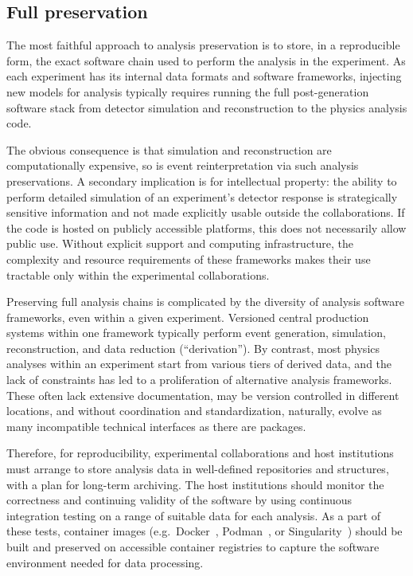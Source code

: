 \documentclass[11pt]{article}
\begin{document}
\subsection{Full preservation}\label{section:full-detail-preservation}

The most faithful approach to analysis preservation is to store, in a reproducible form, the exact software chain used to perform the analysis in the experiment. As each experiment has its internal data formats and software frameworks, injecting new models for analysis typically requires running the full post-generation software stack from detector simulation and reconstruction to the physics analysis code.

The obvious consequence is that simulation and reconstruction are computationally expensive, so is event reinterpretation via such \glspl{analysis preservation}. A secondary implication is for intellectual property: the ability to perform detailed simulation of an experiment's detector response is strategically sensitive information and not made explicitly usable outside the collaborations. If the code is hosted on publicly accessible platforms, this does not necessarily allow public use. Without explicit support and computing infrastructure, the complexity and resource requirements of these frameworks makes their use tractable only within the experimental collaborations.

Preserving full analysis chains is complicated by the diversity of analysis software frameworks, even within a given experiment.
Versioned central production systems within one framework typically perform event generation, simulation, reconstruction, and data reduction (``derivation'').
By contrast, most physics analyses within an experiment start from various tiers of derived data, and the lack of constraints has led to a proliferation of alternative analysis frameworks.
These often lack extensive documentation, may be version controlled in different locations, and without coordination and standardization, naturally, evolve as many incompatible technical interfaces as there are packages.

Therefore, for reproducibility, experimental collaborations and host institutions must arrange to store analysis data in well-defined repositories and structures, with a plan for long-term archiving.
The host institutions should monitor the correctness and continuing validity of the software by using continuous integration testing on a range of suitable \gls{data} for each analysis.
As a part of these tests, container images (e.g.~Docker~\cite{docker}, Podman~\cite{podman}, or Singularity~\cite{singularity}) should be built and preserved on accessible container registries to capture the software environment needed for data processing.
\end{document}

